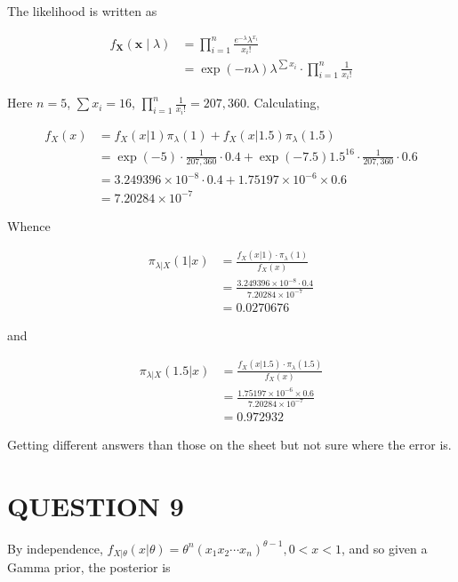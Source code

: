 \documentclass[a4paper]{article}
\begin{document}
The likelihood is written as 


\begin{align*}
f_{\mathbf{X}}(\mathbf{x} \; | \; \lambda) & =  \prod_{i=1}^{n} \frac{e^{-\lambda}\lambda^{x_{i}}}{x_{i}!} \\
& = \exp ( - n \lambda ) \lambda^{\sum x_{i}} \cdot \prod_{i=1}^{n} \frac{1}{x_{i}!}
\end{align*}

Here $ n = 5 $, $ \sum x_{i} = 16 $, $ \prod_{i=1}^{n} \frac{1}{x_{i}!} = 207,360 $. Calculating,


\begin{align*}
f_{X}(x) & = f_{X}(x | 1)  \pi_{\lambda}(1) +  f_{X}(x | 1.5)  \pi_{\lambda}(1.5) \\
& = \exp(-5) \cdot \frac{1}{207,360} \cdot 0.4 + \exp(-7.5) 1.5^{16} \cdot  \frac{1}{207,360} \cdot 0.6 \\
& = 3.249396 \times 10^{-8} \cdot 0.4 + 1.75197 \times 10^{-6} \times 0.6 \\
& = 7.20284 \times 10^{-7}
\end{align*}
	
Whence

\begin{align*}
\pi_{\lambda| X}(1|x)& = \frac{f_{X}(x | 1) \cdot \pi_{\lambda}(1)}{f_{X}(x)} \\
& = \frac{3.249396 \times 10^{-8} \cdot 0.4}{7.20284 \times 10^{-7}} \\
& = 0.0270676
\end{align*}

and

\begin{align*}
\pi_{\lambda| X}(1.5|x)& = \frac{f_{X}(x | 1.5) \cdot \pi_{\lambda}(1.5)}{f_{X}(x)} \\
& = \frac{1.75197 \times 10^{-6} \times 0.6}{7.20284 \times 10^{-7}} \\
& = 0.972932
\end{align*}

Getting different answers than those on the sheet but not sure where the error is. 



\section{QUESTION 9}

By independence, $ f_{X|\theta}(x|\theta) = \theta^{n} (x_{1}x_{2}\cdots x_{n})^{\theta-1}, 0 < x < 1 $, and so given a Gamma prior, the posterior is 
\end{document}
